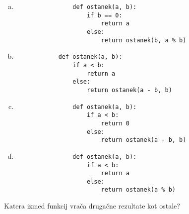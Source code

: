 \documentclass[arhiv, 10pt]{../izpit}
\begin{document}
        \begin{multicols}{2}
        \begin{enumerate}[(a)]
\item 
                \begin{verbatim}
                def ostanek(a, b):
                    if b == 0:
                        return a
                    else:
                        return ostanek(b, a % b)
                \end{verbatim}
            
\item 
            \begin{verbatim}
            def ostanek(a, b):
                if a < b:
                    return a
                else:
                    return ostanek(a - b, b)
            \end{verbatim}
        
\item 
                \begin{verbatim}
                def ostanek(a, b):
                    if a < b:
                        return 0
                    else:
                        return ostanek(a - b, b)
                \end{verbatim}
            
\item 
                \begin{verbatim}
                def ostanek(a, b):
                    if a < b:
                        return a
                    else:
                        return ostanek(a % b)
                \end{verbatim}
            
\end{enumerate}

        \end{multicols}
    
        \naloga*
        
        Katera izmed funkcij vrača drugačne rezultate kot ostale?
    
\end{document}
